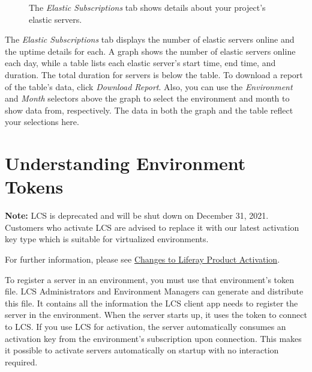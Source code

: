 \noindent\hrulefill

\begin{figure}
\centering
{}
\caption{The \emph{Elastic Subscriptions} tab shows details about your
project's elastic servers.}
\end{figure}

The \emph{Elastic Subscriptions} tab displays the number of elastic
servers online and the uptime details for each. A graph shows the number
of elastic servers online each day, while a table lists each elastic
server's start time, end time, and duration. The total duration for
servers is below the table. To download a report of the table's data,
click \emph{Download Report}. Also, you can use the \emph{Environment}
and \emph{Month} selectors above the graph to select the environment and
month to show data from, respectively. The data in both the graph and
the table reflect your selections here.

\chapter{Understanding Environment
Tokens}\label{understanding-environment-tokens}

\noindent\hrulefill

\textbf{Note:} LCS is deprecated and will be shut down on December 31,
2021. Customers who activate LCS are advised to replace it with our
latest activation key type which is suitable for virtualized
environments.

For further information, please see
\href{https://help.liferay.com/hc/en-us/articles/4402347960845-Changes-to-Liferay-Product-Activation}{Changes
to Liferay Product Activation}.

\noindent\hrulefill

To register a server in an environment, you must use that environment's
token file. LCS Administrators and Environment Managers can generate and
distribute this file. It contains all the information the LCS client app
needs to register the server in the environment. When the server starts
up, it uses the token to connect to LCS. If you use LCS for activation,
the server automatically consumes an activation key from the
environment's subscription upon connection. This makes it possible to
activate servers automatically on startup with no interaction required.

\noindent\hrulefill

